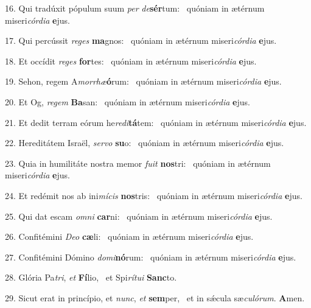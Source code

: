 16. Qui tradúxit pópulum suum \textit{per} \textit{de}\textbf{sér}tum: \ast\  quóniam in ætérnum miseri\textit{cór}\textit{di}\textit{a} \textbf{e}jus.\

17. Qui percússit \textit{re}\textit{ges} \textbf{ma}gnos: \ast\  quóniam in ætérnum miseri\textit{cór}\textit{di}\textit{a} \textbf{e}jus.\

18. Et occídit \textit{re}\textit{ges} \textbf{for}tes: \ast\  quóniam in ætérnum miseri\textit{cór}\textit{di}\textit{a} \textbf{e}jus.\

19. Sehon, regem A\textit{mor}\textit{rhæ}\textbf{ó}rum: \ast\  quóniam in ætérnum miseri\textit{cór}\textit{di}\textit{a} \textbf{e}jus.\

20. Et Og, \textit{re}\textit{gem} \textbf{Ba}san: \ast\  quóniam in ætérnum miseri\textit{cór}\textit{di}\textit{a} \textbf{e}jus.\

21. Et dedit terram eórum he\textit{re}\textit{di}\textbf{tá}tem: \ast\  quóniam in ætérnum miseri\textit{cór}\textit{di}\textit{a} \textbf{e}jus.\

22. Hereditátem Israël, \textit{ser}\textit{vo} \textbf{su}o: \ast\  quóniam in ætérnum miseri\textit{cór}\textit{di}\textit{a} \textbf{e}jus.\

23. Quia in humilitáte nostra memor \textit{fu}\textit{it} \textbf{nos}tri: \ast\  quóniam in ætérnum miseri\textit{cór}\textit{di}\textit{a} \textbf{e}jus.\

24. Et redémit nos ab ini\textit{mí}\textit{cis} \textbf{nos}tris: \ast\  quóniam in ætérnum miseri\textit{cór}\textit{di}\textit{a} \textbf{e}jus.\

25. Qui dat escam \textit{om}\textit{ni} \textbf{car}ni: \ast\  quóniam in ætérnum miseri\textit{cór}\textit{di}\textit{a} \textbf{e}jus.\

26. Confitémini \textit{De}\textit{o} \textbf{cæ}li: \ast\  quóniam in ætérnum miseri\textit{cór}\textit{di}\textit{a} \textbf{e}jus.\

27. Confitémini Dómino \textit{do}\textit{mi}\textbf{nó}rum: \ast\  quóniam in ætérnum miseri\textit{cór}\textit{di}\textit{a} \textbf{e}jus.\

28. Glória Pa\textit{tri}, \textit{et} \textbf{Fí}lio, \ast\  et Spi\textit{rí}\textit{tu}\textit{i} \textbf{Sanc}to.\

29. Sicut erat in princípio, et \textit{nunc}, \textit{et} \textbf{sem}per, \ast\  et in sǽcula sæ\textit{cu}\textit{ló}\textit{rum}. \textbf{A}men.\

